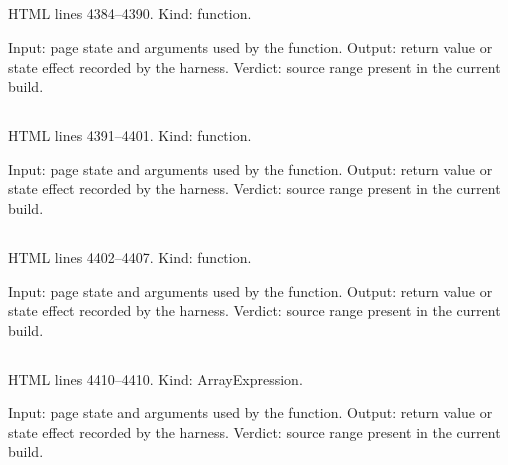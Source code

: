 \subsection*{\texttt{}}
\label{vf_170_sopTargetSpec}
HTML lines 4384--4390. Kind: function.

Input: page state and arguments used by the function.
Output: return value or state effect recorded by the harness.
Verdict: source range present in the current build.

\subsection*{\texttt{}}
\label{vf_171_sopRunApplicability}
HTML lines 4391--4401. Kind: function.

Input: page state and arguments used by the function.
Output: return value or state effect recorded by the harness.
Verdict: source range present in the current build.

\subsection*{\texttt{}}
\label{vf_172_sopReplicateMinimum}
HTML lines 4402--4407. Kind: function.

Input: page state and arguments used by the function.
Output: return value or state effect recorded by the harness.
Verdict: source range present in the current build.

\subsection*{\texttt{}}
\label{vf_173_CC_TARGET_ALIAS}
HTML lines 4410--4410. Kind: ArrayExpression.

Input: page state and arguments used by the function.
Output: return value or state effect recorded by the harness.
Verdict: source range present in the current build.

